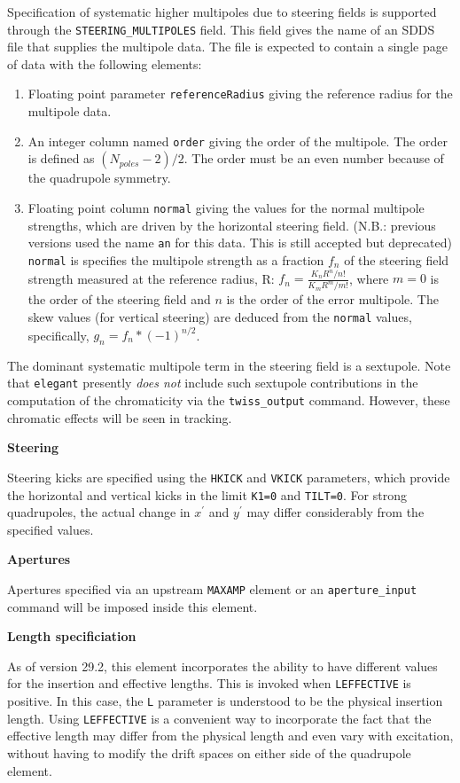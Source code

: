 Specification of systematic higher multipoles due to steering fields is
supported through the \verb|STEERING_MULTIPOLES| field.  This field gives the
name of an SDDS file that supplies the multipole data.  The file is
expected to contain a single page of data with the following elements:
\begin{enumerate}
\item Floating point parameter {\tt referenceRadius} giving the reference
 radius for the multipole data.
\item An integer column named {\tt order} giving the order of the multipole.
The order is defined as $(N_{poles}-2)/2$.  The order must be an even number
because of the quadrupole symmetry.
\item Floating point column {\tt normal} giving the values for the normal
multipole strengths, which are driven by the horizontal steering field.
(N.B.: previous versions used the name {\tt an} for this data. This is still accepted but deprecated)
{\tt normal} is specifies the multipole strength as a fraction $f_n$ of the steering field strength measured at the reference radius, R: 
$f_n = \frac{K_n R^n / n!}{K_m R^m / m!}$, where 
$m=0$ is the order of the steering field and $n$ is the order of the error multipole.
The skew values (for vertical steering) are deduced from the {\tt normal} values, specifically,
$g_n = f_n*(-1)^{n/2}$.
\end{enumerate}

The dominant systematic multipole term in the steering field is a
sextupole.  Note that {\tt elegant} presently {\em does not} include
such sextupole contributions in the computation of the chromaticity
via the {\tt twiss\_output} command.  However, these chromatic effects
will be seen in tracking.

{\bf Steering}

Steering kicks are specified using the \verb|HKICK| and \verb|VKICK| parameters, which provide the horizontal and vertical kicks
in the limit \verb|K1=0| and \verb|TILT=0|.
For strong quadrupoles, the actual change in $x^\prime$ and $y^\prime$ may differ considerably from the specified values.

{\bf Apertures}

Apertures specified via an upstream \verb|MAXAMP| element or an \verb|aperture_input|
command will be imposed inside this element.

{\bf Length specificiation}

As of version 29.2, this element incorporates the ability to have different values for the insertion
and effective lengths. This is invoked when \verb|LEFFECTIVE| is positive. In this case, the
\verb|L| parameter is understood to be the physical insertion length. Using \verb|LEFFECTIVE| is
a convenient way to incorporate the fact that the effective length may differ from the physical
length and even vary with excitation, without having to modify the drift spaces on either side of
the quadrupole element.

